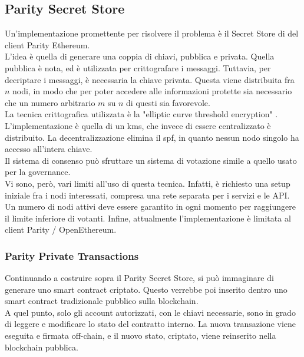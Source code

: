 \documentclass[12pt, letterpaper, twoside]{article}
\begin{document}
\subsection{Parity Secret Store}
Un'implementazione promettente per risolvere il problema è il Secret Store di del client Parity Ethereum. \\
L'idea è quella di generare una coppia di chiavi, pubblica e privata. 
Quella pubblica è nota, ed è utilizzata per crittografare i messaggi.
Tuttavia, per decriptare i messaggi, è necessaria la chiave privata.
Questa viene distribuita fra $n$ nodi, in modo che per poter accedere alle informazioni protette sia necessario che un numero arbitrario $m$ su $n$ di questi sia favorevole. \\
La tecnica crittografica utilizzata è la "elliptic curve threshold encryption" \cite{art:ecdkg}. \\
L'implementazione è quella di un \gls{kms}, che invece di essere centralizzato è distribuito.
La decentralizzazione elimina il \gls{spf}, in quanto nessun nodo singolo ha accesso all'intera chiave. \\
Il sistema di consenso può sfruttare un sistema di votazione simile a quello usato per la governance. \\
Vi sono, però, vari limiti all'uso di questa tecnica. 
Infatti, è richiesto una setup iniziale fra i nodi interessati, compresa una rete separata per i servizi e le API.
Un numero di nodi attivi deve essere garantito in ogni momento per raggiungere il limite inferiore di votanti.
Infine, attualmente l'implementazione è limitata al client Parity / OpenEthereum.
 
\subsubsection{Parity Private Transactions}
Continuando a costruire sopra il Parity Secret Store, si può immaginare di generare uno smart contract criptato.
Questo verrebbe poi inserito dentro uno smart contract tradizionale pubblico sulla blockchain. \\
A quel punto, solo gli account autorizzati, con le chiavi necessarie, sono in grado di leggere e modificare lo stato del contratto interno.
La nuova transazione viene eseguita e firmata off-chain, e il nuovo stato, criptato, viene reinserito nella blockchain pubblica.
 
\end{document}
